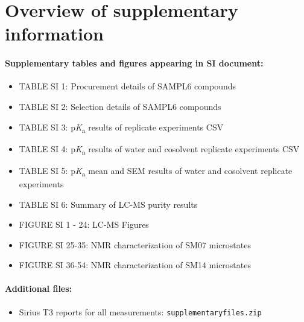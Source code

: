\documentclass[9pt,lineno]{elife}
\newcommand{\pKa}{p\textit{K}\textsubscript{a}}
\begin{document}
\section{Overview of supplementary information}

\paragraph{Supplementary tables and figures appearing in SI document:}

\begin{itemize}
\item TABLE SI 1: Procurement details of SAMPL6 compounds  

\item TABLE SI 2: Selection details of SAMPL6 compounds  

\item TABLE SI 3: \pKa{} results of replicate experiments CSV

\item TABLE SI 4: \pKa{} results of water and cosolvent replicate experiments CSV

\item TABLE SI 5: \pKa{} mean and SEM results of water and cosolvent replicate experiments

\item TABLE SI 6: Summary of LC-MS purity results

\item FIGURE SI 1 - 24:  LC-MS Figures  

\item FIGURE SI 25-35: NMR characterization of SM07 microstates  

\item FIGURE SI 36-54: NMR characterization of SM14 microstates  
\end{itemize}

\paragraph{Additional files:}  
\begin{itemize}
\item Sirius T3 reports for all measurements: {\tt supplementary\textunderscore files.zip}
\end{itemize}
\end{document}
